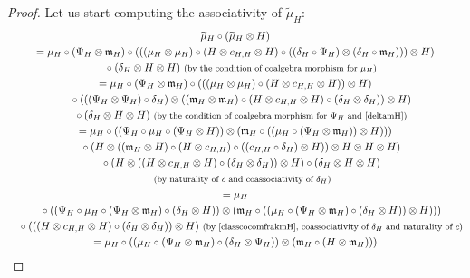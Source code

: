 \documentclass[pdftex]{sigma}
\numberwithin{equation}{section}
\begin{document}
\begin{proof}
Let us start computing the associativity of $\widetilde{\mu}_{H}$:
\begin{gather*}
\widetilde{\mu}_{H}\circ(\widetilde{\mu}_{H}\otimes H)\\
= \mu_{H}\circ(\Psi_{H}\otimes \mathfrak{m}_{H})\circ(((\mu_{H}\otimes\mu_{H})\circ(H\otimes c_{H,H}\otimes H)\circ((\delta_{H}\circ\Psi_{H})\otimes(\delta_{H}\circ \mathfrak{m}_{H})))\otimes H)\\
\quad{}\circ(\delta_{H}\otimes H\otimes H)\ \text{\footnotesize\textnormal{(by the condition of coalgebra morphism for $\mu_{H}$)}}\\
= \mu_{H}\circ(\Psi_{H}\otimes \mathfrak{m}_{H})\circ (((\mu_{H}\otimes \mu_{H})\circ(H\otimes c_{H,H}\otimes H))\otimes H)\\
\quad{}\circ (((\Psi_{H}\otimes \Psi_{H})\circ\delta_{H})\otimes((\mathfrak{m}_{H}\otimes \mathfrak{m}_{H})\circ(H\otimes c_{H,H}\otimes H)\circ(\delta_{H}\otimes\delta_{H}))\otimes H)\\
\quad{}\circ(\delta_{H}\otimes H\otimes H)\ \text{\footnotesize\textnormal{(by the condition of coalgebra morphism for $\Psi_{H}$ and \eqref{deltamH})}}\\
= \mu_{H}\circ ((\Psi_{H}\circ\mu_{H}\circ(\Psi_{H}\otimes H))\otimes(\mathfrak{m}_{H}\circ((\mu_{H}\circ(\Psi_{H}\otimes \mathfrak{m}_{H}))\otimes H)))\\
\quad{}\circ(H\otimes ((\mathfrak{m}_{H}\otimes H)\circ (H\otimes c_{H,H})\circ((c_{H,H}\circ\delta_{H})\otimes H))\otimes H\otimes H\otimes H)\\
\quad{}\circ(H\otimes((H\otimes c_{H,H}\otimes H)\circ(\delta_{H}\otimes\delta_{H}))\otimes H)\circ(\delta_{H}\otimes H\otimes H)\\
\quad{}\ \text{\footnotesize\textnormal{(by naturality of $c$ and coassociativity of $\delta_{H}$)}}\\
= \mu_{H}\\
\quad{}\circ((\Psi_{H}\circ\mu_{H}\circ (\Psi_{H}\otimes \mathfrak{m}_{H})\circ(\delta_{H}\otimes H))\otimes(\mathfrak{m}_{H}\circ((\mu_{H}\circ(\Psi_{H}\otimes \mathfrak{m}_{H})\circ(\delta_{H}\otimes H))\otimes H)))\\
\quad{} \circ(((H\otimes c_{H,H}\otimes H)\circ(\delta_{H}\otimes\delta_{H}))\otimes H)\ \text{\footnotesize\textnormal{(by \eqref{classcocomfrakmH}, coassociativity of $\delta_{H}$ and naturality of $c$)}}\\
= \mu_{H}\circ((\mu_{H}\circ (\Psi_{H}\otimes \mathfrak{m}_{H})\circ(\delta_{H}\otimes \Psi_{H}))\otimes(\mathfrak{m}_{H}\circ(H\otimes \mathfrak{m}_{H})))\\

\end{gather*}
\end{proof}
\end{document}
